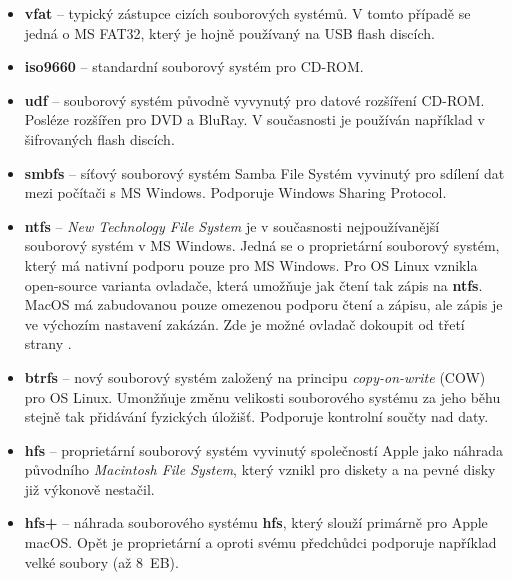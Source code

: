 \begin{itemize}
    \item \textbf{vfat} -- typický zástupce cizích souborových systémů. V tomto případě se jedná o MS FAT32, který je hojně používaný na USB flash discích.
    \item \textbf{iso9660} -- standardní souborový systém pro CD-ROM. 
    \item \textbf{udf} -- souborový systém původně vyvynutý pro datové rozšíření CD-ROM. Posléze rozšířen pro DVD a BluRay. V současnosti je používán například v šifrovaných flash discích. 
    \item \textbf{smbfs} -- síťový souborový systém Samba File Systém vyvinutý pro sdílení dat mezi počítači s MS Windows. Podporuje Windows Sharing Protocol.
    \item \textbf{ntfs} -- \textit{New Technology File System} je v současnosti nejpoužívanější souborový systém v MS Windows. Jedná se o proprietární souborový systém, který má nativní podporu pouze pro MS Windows. Pro OS Linux vznikla open-source varianta ovladače, která umožňuje jak čtení tak zápis na \textbf{ntfs}. MacOS má zabudovanou pouze omezenou podporu čtení a zápisu, ale zápis je ve výchozím nastavení zakázán. Zde je možné ovladač dokoupit od třetí strany \cite{paragon-ntfs}.
    \item \textbf{btrfs} -- nový souborový systém založený na principu \textit{copy-on-write} (COW) pro OS Linux. Umonžňuje změnu velikosti souborového systému za jeho běhu stejně tak přidávání fyzických úložišť. Podporuje kontrolní součty nad daty.
    \item \textbf{hfs} -- proprietární souborový systém vyvinutý společností Apple jako náhrada původního \textit{Macintosh File System}, který vznikl pro diskety a na pevné disky již výkonově nestačil.
    \item \textbf{hfs+} -- náhrada souborového systému \textbf{hfs}, který slouží primárně pro Apple macOS. Opět je proprietární a oproti svému předchůdci podporuje například velké soubory (až 8~EB).
\end{itemize}

